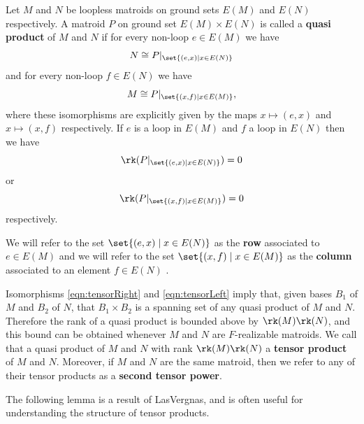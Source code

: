    \begin{definition}\label{def:tensorproduct}
    Let $M$ and $N$ be loopless matroids on ground sets $E(M)$ and $E(N)$ respectively. A matroid $P$ on ground set $E(M)\times E(N)$ is called a \textbf{quasi product} of $M$ and $N$ if for every non-loop $e\in E(M)$ we have
    \begin{equation} \label{eqn:tensorRight}
        N\cong P|_{\set{(e,x)\mid x\in E(N)}}
    \end{equation}
    and for every non-loop $f\in E(N)$ we have
    \begin{equation}\label{eqn:tensorLeft}
        M\cong P|_{\set{(x,f)\mid x\in E(M)}},
    \end{equation}
    where these isomorphisms are explicitly given by the maps $x\mapsto (e,x)$ and $x\mapsto (x,f)$ respectively. If $e$ is a loop in $E(M)$ and $f$ a loop in $E(N)$ then we have
    \begin{equation}\label{eqn:tensorRight0}
        \rk(P|_{\set{(e,x)\mid x\in E(N)}})=0
    \end{equation}
    or
    \begin{equation}\label{eqn:tensorLeft0}
    \rk(P|_{\set{(x,f)\mid x\in E(M)}})=0
    \end{equation}
    respectively.

    We will refer to the set $\set{(e,x)\mid x\in E(N)}$ as the \textbf{row} associated to $e\in E(M)$ and we will refer to the set $\set{(x,f)\mid x\in E(M)}$ as the \textbf{column} associated to an element $f\in E(N)$ .
    \end{definition}
    
    Isomorphisms \ref{eqn:tensorRight} and \ref{eqn:tensorLeft} imply that, given bases $B_1$ of $M$ and $B_2$ of $N$, that $B_1\times B_2$ is a spanning set of any quasi product of $M$ and $N$. Therefore the rank of a quasi product is bounded above by $\rk(M)\rk(N)$, and this bound can be obtained whenever $M$ and $N$ are $F$-realizable matroids. We call that a quasi product of $M$ and $N$ with rank $\rk(M)\rk(N)$ a \textbf{tensor product} of $M$ and $N$. Moreover, if $M$ and $N$ are the same matroid, then we refer to any of their tensor products as a \textbf{second tensor power}.

    The following lemma is a result of LasVergnas, and is often useful for understanding the structure of tensor products.
    
